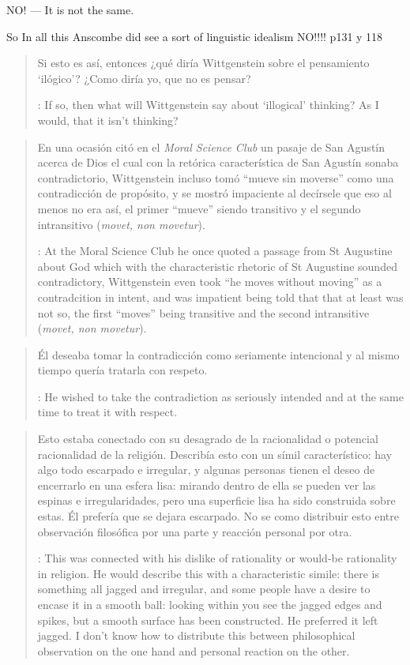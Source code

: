 NO! --- It is not the same.


So In all this Anscombe did see a sort of linguistic idealism NO!!!! p131 y 118

\blockquote[{\cite[122]{anscombe1981parmenides:qli}}: If so, then what will Wittgenstein say about `illogical' thinking? As I would, that it isn't thinking?]{Si esto es así, entonces ¿qué diría Wittgenstein sobre el pensamiento `ilógico'? ¿Como diría yo, que no es pensar?}

\blockquote[{\cite[122]{anscombe1981parmenides:qli}}: At the Moral Science Club he once quoted a passage from St Augustine about God which with the characteristic rhetoric of St Augustine sounded contradictory, Wittgenstein even took ``he moves without moving'' as a contradcition in intent, and was impatient being told that that at least was not so, the first ``moves'' being transitive and the second intransitive (\emph{movet, non movetur}).]{En una ocasión citó en el \emph{Moral Science Club} un pasaje de San Agustín acerca de Dios el cual con la retórica característica de San Agustín sonaba contradictorio, Wittgenstein incluso tomó ``mueve sin moverse'' como una contradicción de propósito, y se mostró impaciente al decírsele que eso al menos no era así, el primer ``mueve'' siendo transitivo y el segundo intransitivo (\emph{movet, non movetur}).}

\blockquote[{\cite[122]{anscombe1981parmenides:qli}}: He wished to take the contradiction as seriously intended and at the same time to treat it with respect.]{Él deseaba tomar la contradicción como seriamente intencional y al mismo tiempo quería tratarla con respeto.}

\blockquote[{\cite[122]{anscombe1981parmenides:qli}}: This was connected with his dislike of rationality or would-be rationality in religion. He would describe this with a characteristic simile: there is something all jagged and irregular, and some people have a desire to encase it in a smooth ball: looking within you see the jagged edges and spikes, but a smooth surface has been constructed. He preferred it left jagged. I don't know how to distribute this between philosophical observation on the one hand and personal reaction on the other.]{Esto estaba conectado con su desagrado de la racionalidad o potencial racionalidad de la religión. Describía esto con un símil característico: hay algo todo escarpado e irregular, y algunas personas tienen el deseo de encerrarlo en una esfera lisa: mirando dentro de ella se pueden ver las espinas e irregularidades, pero una superficie lisa ha sido construida sobre estas. Él prefería que se dejara escarpado. No se como distribuir esto entre observación filosófica por una parte y reacción personal por otra.}

